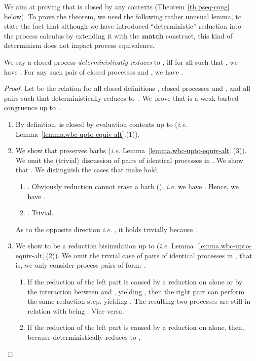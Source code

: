 \documentclass{LMCS}
\makeatletter
\newcommand{\ie}{\emph{i.e.}\@\xspace}
\newcommand{\kwd}[1]{\ensuremath{\mathbf{#1}}}
\renewcommand{\_}{\mathord{\rule[-.25ex]{1ex}{.15ex}}}
\makeatother
\begin{document}
We aim at proving that  is closed by any contexts
(Theorem~\ref{th.pseq-cong} below). To prove the theorem, we need the
following rather unusual lemma, to state the fact that although we
have introduced ``deterministic'' reduction into the process calculus
by extending it with the \kwd{match} construct, this kind of
determinism does not impact process equivalence.
\begin{lem}\label{lemma.joinpi.reduces}
  We say a closed process  \emph{deterministically reduces} to ,
  iff for all  such that , we have .
  For any such pair of closed processes  and , we have  .
\end{lem}
\begin{proof}
  Let  be the relation  for all closed definitions
  , closed processes  and , and all  pairs such
  that  deterministically reduces to~. We prove that 
  is a weak barbed congruence up to~.
  \begin{enumerate}[]
  \item By definition,  is closed by evaluation contexts
    up to  (\ie Lemma~\ref{lemma.wbc-upto-equiv-alt}.(1)).
  \item We show that  preserves barbs (\ie
    Lemma~\ref{lemma.wbc-upto-equiv-alt}.(3)). We omit the (trivial) discussion
    of pairs of identical processes  in .
    We show that . We distinguish the
    cases that make  hold.
    \begin{enumerate}[]
    \item .
      Obviously reduction cannot erase a barb  (), \ie
      we have .
      Hence, we have .
    \item . Trivial.
    \end{enumerate}
    As to the opposite direction \ie
    , it holds trivially
    because .
  \item We show  to be a reduction bisimulation up to 
    (\ie Lemma~\ref{lemma.wbc-upto-equiv-alt}.(2)). We omit the
    trivial case of pairs of identical processes in , that is,
    we only consider process pairs of form: .
    \begin{enumerate}[]
    \item If the reduction of the left part is caused by a reduction
      on  alone or by the interaction between  and , yielding
      , then the right part can perform
      the same reduction step, yielding .
      The resulting two processes are still in relation  with 
      being . Vice versa.
    \item If the reduction of the left part is caused by a reduction
      on  alone, then, because  deterministically reduces to ,

\end{enumerate}
\end{enumerate}
\end{proof}
\end{document}

